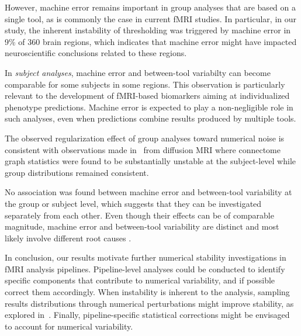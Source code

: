 \documentclass[conference]{IEEEtran}
\begin{document}
However, machine error remains important in group analyses that are based
on a single tool, as is commonly the case in current fMRI studies. In
particular, in our study, the inherent instability of thresholding was
triggered by machine error in 9\% of 360 brain regions, which indicates
that machine error might have impacted neuroscientific conclusions related
to these regions. 

In \emph{subject analyses}, machine error and between-tool variabilty can
become comparable for some subjects in some regions. This observation is particularly
relevant to the development of fMRI-based biomarkers aiming at
individualized phenotype predictions. Machine error is expected to play
a non-negligible role in such analyses, even when predictions combine
results produced by multiple tools.

The observed regularization effect of group analyses toward numerical noise 
is consistent with observations made in~\cite{kiar2020numerical} from diffusion MRI where 
connectome graph statistics were found to be substantially unstable at the subject-level 
while group distributions remained consistent. 


No association was found between
machine error and between-tool variability at the group or subject level,
which suggests that they can be investigated separately from each other.
Even though their effects can be of comparable magnitude, machine error and
between-tool variability are distinct and most likely involve different
root causes .

In conclusion, our results motivate further numerical stability
investigations in fMRI analysis pipelines. Pipeline-level analyses could be
conducted to identify specific components that contribute to numerical
variability, and if possible correct them accordingly. When instability is
inherent to the analysis, sampling results distributions through numerical
perturbations might improve stability, as explored in~\cite{kiar2021data}.
Finally, pipeline-specific statistical corrections might be envisaged to
account for numerical variability.

\appendix
\end{document}

